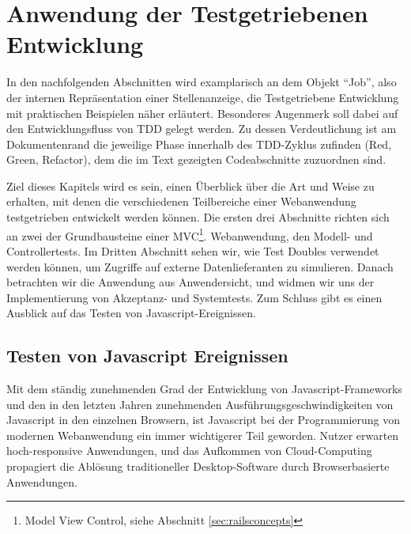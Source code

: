 \section{Anwendung der Testgetriebenen Entwicklung}
\label{sec:awtdd}

In den nachfolgenden Abschnitten wird examplarisch an dem Objekt "`Job"', also der internen Repräsentation einer Stellenanzeige, die Testgetriebene Entwicklung mit praktischen Beispielen näher erläutert.
Besonderes Augenmerk soll dabei auf den Entwicklungsfluss von TDD gelegt werden. Zu dessen Verdeutlichung ist am Dokumentenrand die jeweilige Phase innerhalb des TDD-Zyklus zufinden (Red, Green, Refactor), dem die im Text gezeigten Codeabschnitte zuzuordnen sind.

Ziel dieses Kapitels wird es sein, einen Überblick über die Art und Weise zu erhalten, mit denen die verschiedenen Teilbereiche einer Webanwendung testgetrieben entwickelt werden können.
Die ersten drei Abschnitte richten sich an zwei der Grundbausteine einer MVC\footnote{Model View Control, siehe Abschnitt \ref{sec:railsconcepts}}.
Webanwendung, den Modell- und Controllertests. Im Dritten Abschnitt sehen wir, wie Test Doubles verwendet werden können, um Zugriffe auf externe Datenlieferanten zu simulieren. Danach betrachten wir die Anwendung aus Anwendersicht, und widmen wir uns der Implementierung von Akzeptanz- und Systemtests. %
Zum Schluss gibt es einen Ausblick auf das Testen von Javascript-Ereignissen.











\subsection{Testen von Javascript Ereignissen}

Mit dem ständig zunehmenden Grad der Entwicklung von Javascript-Frameworks und den in den letzten Jahren zunehmenden Ausführungsgeschwindigkeiten von Javascript in den einzelnen Browsern, ist Javascript bei der Programmierung von modernen Webanwendung ein immer wichtigerer Teil geworden. Nutzer erwarten hoch-responsive Anwendungen, und das Aufkommen von Cloud-Computing propagiert die Ablösung traditioneller Desktop-Software durch Browserbasierte Anwendungen.




